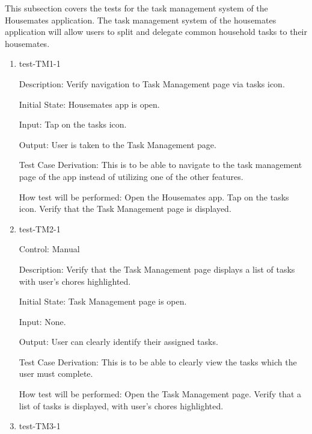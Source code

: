 \documentclass[12pt, titlepage]{article}
\begin{document}
This subsection covers the tests for the task management system of the Housemates application. The task management system of the housemates application will allow users to split and delegate common household tasks to their housemates.


\begin{enumerate}

\item{test-TM1-1\\}

Description: Verify navigation to Task Management page via tasks icon.
					
Initial State: Housemates app is open.
					
Input: Tap on the tasks icon.
					
Output: User is taken to the Task Management page.

Test Case Derivation: This is to be able to navigate to the task management page of the app instead of utilizing one of the other features.
					
How test will be performed: 
Open the Housemates app.
Tap on the tasks icon.
Verify that the Task Management page is displayed.
					
\item{test-TM2-1\\}

Control: Manual

Description: Verify that the Task Management page displays a list of tasks with user's chores highlighted.
					
Initial State: Task Management page is open.
					
Input: None.
					
Output: User can clearly identify their assigned tasks.

Test Case Derivation: This is to be able to clearly view the tasks which the user must complete.

How test will be performed: 
Open the Task Management page.
Verify that a list of tasks is displayed, with user's chores highlighted.

\item{test-TM3-1\\}


\end{enumerate}
\end{document}
